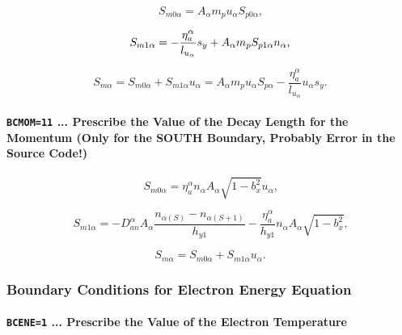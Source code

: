 \documentclass[11pt]{article}
\begin{document}
\bigskip

\begin{equation}
S_{m0\alpha}=A_{\alpha}m_{p}u_{\alpha}S_{p0\alpha}\text{,}   \label{c157}
\end{equation}

\begin{equation}
S_{m1\alpha}=-\frac{\eta_{a}^{\alpha}}{l_{u_{\alpha}}}s_{y}+A_{%
\alpha}m_{p}S_{p1\alpha}n_{\alpha}\text{,}   \label{c158}
\end{equation}

\begin{equation}
S_{m\alpha}=S_{m0\alpha}+S_{m1\alpha}u_{\alpha}=A_{\alpha}m_{p}u_{\alpha
}S_{p\alpha}-\frac{\eta_{a}^{\alpha}}{l_{u_{\alpha}}}u_{\alpha}s_{y}\text{.} 
\label{c159}
\end{equation}

\bigskip

\paragraph{\texttt{BCMOM=11} ... Prescribe the Value of the Decay Length for
the Momentum (Only for the SOUTH Boundary, Probably Error in the Source
Code!)}

\bigskip

\begin{equation}
S_{m0\alpha}=\eta_{a}^{\alpha}n_{\alpha}A_{\alpha}\sqrt{1-b_{x}^{2}}%
u_{\alpha }\text{,}   \label{c160}
\end{equation}

\begin{equation}
S_{m1\alpha}=-D_{an}^{\alpha}A_{\alpha}\frac{n_{\alpha\left( S\right)
}-n_{\alpha\left( S+1\right) }}{h_{y1}}-\frac{\eta_{a}^{\alpha}}{h_{y1}}%
n_{\alpha}A_{\alpha}\sqrt{1-b_{x}^{2}}\text{,}   \label{c161}
\end{equation}

\begin{equation}
S_{m\alpha}=S_{m0\alpha}+S_{m1\alpha}u_{\alpha}\text{.}   \label{c162}
\end{equation}

\bigskip

\subsubsection{Boundary Conditions for Electron Energy Equation}

\bigskip

\paragraph{\texttt{BCENE=1} ... Prescribe the Value of the Electron
Temperature}
\end{document}
